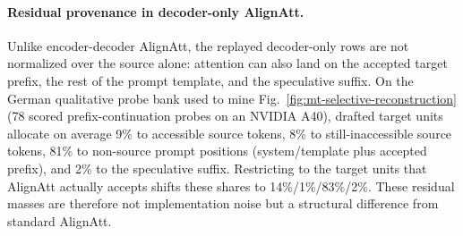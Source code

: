 \paragraph{Residual provenance in decoder-only AlignAtt.}
Unlike encoder-decoder AlignAtt, the replayed decoder-only rows are not normalized over the source alone: attention can also land on the accepted target prefix, the rest of the prompt template, and the speculative suffix. On the German qualitative probe bank used to mine Fig.~\ref{fig:mt-selective-reconstruction} (78 scored prefix-continuation probes on an NVIDIA A40), drafted target units allocate on average 9\% to accessible source tokens, 8\% to still-inaccessible source tokens, 81\% to non-source prompt positions (system/template plus accepted prefix), and 2\% to the speculative suffix. Restricting to the target units that AlignAtt actually accepts shifts these shares to 14\%/1\%/83\%/2\%. These residual masses are therefore not implementation noise but a structural difference from standard AlignAtt.
